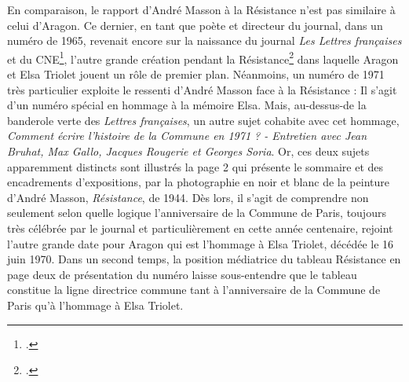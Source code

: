 En comparaison, le rapport d’André Masson à la Résistance n’est pas similaire à celui d’Aragon. Ce dernier, en tant que poète et  directeur du journal, dans un numéro de  1965,  revenait encore  sur la naissance du journal \emph{Les Lettres françaises} et du CNE\footcite{histoirecnetriolet}, l’autre grande création pendant la Résistance\footcite{specialelsa} dans laquelle Aragon et Elsa Triolet jouent un rôle de premier plan. Néanmoins, un numéro de 1971 très particulier exploite le ressenti d’André Masson face à la Résistance : Il s’agit d’un numéro spécial en hommage à la mémoire Elsa. Mais, au-dessus-de la banderole verte des \emph{Lettres françaises}, un autre sujet cohabite avec cet hommage, \emph{Comment écrire l’histoire de la Commune en 1971 ? - Entretien avec Jean Bruhat, Max Gallo, Jacques Rougerie et Georges Soria}. Or, ces deux sujets apparemment distincts sont illustrés la page 2 qui présente le sommaire et des encadrements d’expositions, par la photographie en noir et blanc de la peinture d’André Masson, \emph{Résistance}, de 1944. Dès lors, il s’agit de comprendre non seulement selon quelle logique l’anniversaire de la Commune de Paris, toujours très célébrée par le journal et particulièrement en cette année centenaire, rejoint l’autre grande date pour Aragon qui est l’hommage à Elsa Triolet, décédée le 16 juin 1970. Dans un second temps, la position médiatrice du tableau Résistance en page deux de présentation du numéro laisse sous-entendre que le tableau constitue la ligne directrice commune tant à l’anniversaire de la Commune de Paris qu’à l’hommage à Elsa Triolet. 




